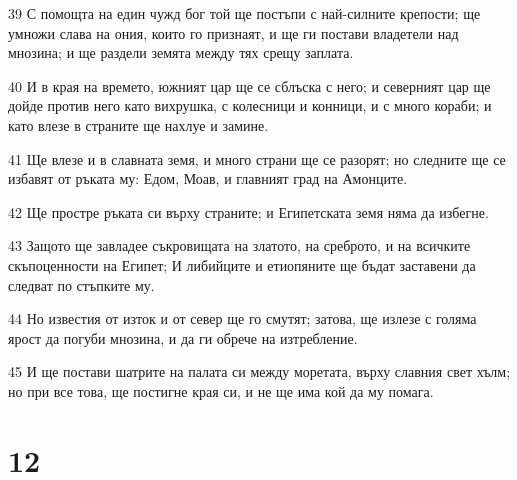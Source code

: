 \par 39 С помощта на един чужд бог той ще постъпи с най-силните крепости; ще умножи слава на ония, които го признаят, и ще ги постави владетели над мнозина; и ще раздели земята между тях срещу заплата.
\par 40 И в края на времето, южният цар ще се сблъска с него; и северният цар ще дойде против него като вихрушка, с колесници и конници, и с много кораби; и като влезе в страните ще нахлуе и замине.
\par 41 Ще влезе и в славната земя, и много страни ще се разорят; но следните ще се избавят от ръката му: Едом, Моав, и главният град на Амонците.
\par 42 Ще простре ръката си върху страните; и Египетската земя няма да избегне.
\par 43 Защото ще завладее съкровищата на златото, на среброто, и на всичките скъпоценности на Египет; И либийците и етиопяните ще бъдат заставени да следват по стъпките му.
\par 44 Но известия от изток и от север ще го смутят; затова, ще излезе с голяма ярост да погуби мнозина, и да ги обрече на изтребление.
\par 45 И ще постави шатрите на палата си между моретата, върху славния свет хълм; но при все това, ще постигне края си, и не ще има кой да му помага.

\chapter{12}

